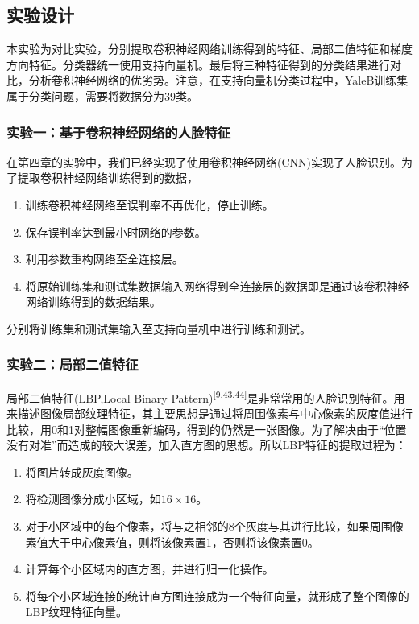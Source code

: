 \documentclass[bachelor,zhspacing]{cqu}  %
\def\tightlist{}
\begin{document}
\subsection{实验设计}\label{ux5b9eux9a8cux8bbeux8ba1}

本实验为对比实验，分别提取卷积神经网络训练得到的特征、局部二值特征和梯度方向特征。分类器统一使用支持向量机。最后将三种特征得到的分类结果进行对比，分析卷积神经网络的优劣势。注意，在支持向量机分类过程中，YaleB训练集属于分类问题，需要将数据分为39类。

\subsubsection{实验一：基于卷积神经网络的人脸特征}\label{ux5b9eux9a8cux4e00ux57faux4e8eux5377ux79efux795eux7ecfux7f51ux7edcux7684ux4ebaux8138ux7279ux5f81}

在第四章的实验中，我们已经实现了使用卷积神经网络(CNN)实现了人脸识别。为了提取卷积神经网络训练得到的数据，

\begin{enumerate}
\def\labelenumi{\arabic{enumi}.}
\tightlist
\item
  训练卷积神经网络至误判率不再优化，停止训练。
\item
  保存误判率达到最小时网络的参数。
\item
  利用参数重构网络至全连接层。
\item
  将原始训练集和测试集数据输入网络得到全连接层的数据即是通过该卷积神经网络训练得到的数据结果。
\end{enumerate}

分别将训练集和测试集输入至支持向量机中进行训练和测试。

\subsubsection{实验二：局部二值特征}\label{ux5b9eux9a8cux4e8cux5c40ux90e8ux4e8cux503cux7279ux5f81}

局部二值特征(LBP,Local Binary
Pattern)\textsuperscript{{[}9,43,44{]}}是非常常用的人脸识别特征。用来描述图像局部纹理特征，其主要思想是通过将周围像素与中心像素的灰度值进行比较，用0和1对整幅图像重新编码，得到的仍然是一张图像。为了解决由于``位置没有对准''而造成的较大误差，加入直方图的思想。所以LBP特征的提取过程为：

\begin{enumerate}
\def\labelenumi{\arabic{enumi}.}
\tightlist
\item
  将图片转成灰度图像。
\item
  将检测图像分成小区域，如\(16\times 16\)。
\item
  对于小区域中的每个像素，将与之相邻的8个灰度与其进行比较，如果周围像素值大于中心像素值，则将该像素置1，否则将该像素置0。
\item
  计算每个小区域内的直方图，并进行归一化操作。
\item
  将每个小区域连接的统计直方图连接成为一个特征向量，就形成了整个图像的LBP纹理特征向量。
\end{enumerate}
\end{document}
